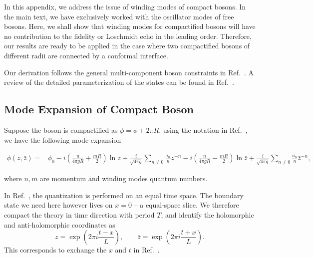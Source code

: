 
In this appendix, we address the issue of winding modes of compact bosons. In the main text, we have exclusively worked with the oscillator modes of free bosons. Here, we shall show that winding modes for compactified bosons will have no contribution to the fidelity or Loschmidt echo in the leading order. Therefore, our results are ready to be applied in the case where two compactified bosons of different radii are connected by a conformal interface\cite{PhysRevLett.118.136801}. 

Our derivation follows the general multi-component boson constraints in Ref.~. A review of the detailed parameterization of the states can be found in Ref.~. 

\subsection{Mode Expansion of Compact Boson}
Suppose the boson is compactified as $\phi =  \phi + 2\pi R$, using the notation in Ref.~, we have the following mode expansion 
\begin{widetext}
\begin{equation}
\label{eq:boson-mode-exp}
\begin{aligned}
\phi( z, \bar{z}) = &\phi_0 -i \left( \frac{n}{4\pi g  R} + \frac{m R }{2} \right)  \ln z + \frac{i}{\sqrt{4\pi g}} \sum_{n\ne 0 } \frac{a_n}{n} z^{-n } -i \left( \frac{n}{4\pi g R} - \frac{m R }{2} \right)  \ln \bar{z} + \frac{i}{\sqrt{4\pi g}} \sum_{n\ne 0 } \frac{\bar{a}_n}{n} \bar{z}^{-n } ,
\end{aligned}
\end{equation}\end{widetext}
where $n,m$ are momentum and winding modes quantum numbers. 

In Ref.~, the quantization is performed on an equal time space. The boundary state we need here however lives on $x = 0$ -- a equal-space slice. We therefore compact the theory in time direction with period $T$, and identify the holomorphic and anti-holomorphic coordinates as 
\begin{equation}
\label{eq:zzbar}
z = \exp( 2 \pi i \frac{t - x}{L}), \qquad \bar{z} = \exp( 2 \pi i \frac{t + x}{L}).
\end{equation}
This corresponds to exchange the $x$ and $t$ in Ref.~. 

